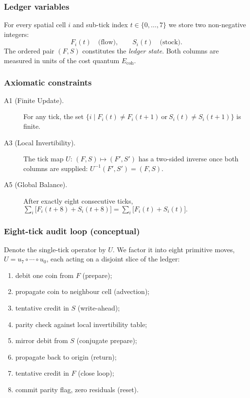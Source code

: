 \documentclass[11pt,oneside]{book}
\begin{document}
\subsubsection{Ledger variables}
\label{subsubsec:ledger-vars}
For every spatial cell \(i\) and sub-tick index \(t\in\{0,\dots,7\}\) we store
two non-negative integers:
\[
  F_{i}(t) \quad\text{(flow)} ,\qquad
  S_{i}(t) \quad\text{(stock)} .
\]
The ordered pair \((F,S)\) constitutes the \emph{ledger state}.  
Both columns are measured in units of the cost quantum \(E_{\text{coh}}\).

\subsubsection{Axiomatic constraints}
\label{subsubsec:ledger-axioms}
\begin{description}
  \item[A1 (Finite Update).]  
    For any tick, the set \(\{i \mid F_{i}(t)\neq F_{i}(t{+}1)\ \text{or}\
      S_{i}(t)\neq S_{i}(t{+}1)\}\) is finite.
  \item[A3 (Local Invertibility).]  
    The tick map \(U:\,(F,S)\!\mapsto\!(F',S')\) has a two-sided inverse once
    both columns are supplied: \(U^{-1}(F',S')=(F,S)\).
  \item[A5 (Global Balance).]  
    After exactly eight consecutive ticks,
    \(\displaystyle
       \sum_{i}\bigl[F_{i}(t{+}8)+S_{i}(t{+}8)\bigr]
       =
       \sum_{i}\bigl[F_{i}(t)+S_{i}(t)\bigr].
    \)
\end{description}

\subsubsection{Eight-tick audit loop (conceptual)}
\label{subsubsec:audit-loop}
Denote the single-tick operator by \(U\).  
We factor it into eight primitive moves,
\(U = u_{7}\circ\cdots\circ u_{0}\),
each acting on a disjoint slice of the ledger:

\begin{enumerate}[label=\textbf{Tick \arabic*:}, leftmargin=2.5em]
  \item debit one coin from \(F\) (prepare);
  \item propagate coin to neighbour cell (advection);
  \item tentative credit in \(S\) (write-ahead);
  \item parity check against local invertibility table;
  \item mirror debit from \(S\) (conjugate prepare);
  \item propagate back to origin (return);
  \item tentative credit in \(F\) (close loop);
  \item commit parity flag, zero residuals (reset).
\end{enumerate}
\end{document}
